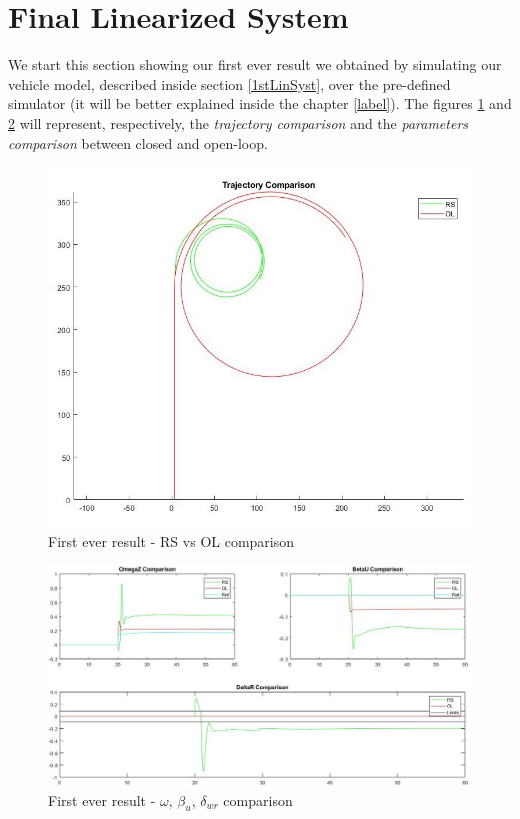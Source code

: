 \section{Final Linearized System} \label{Final LTI}
	We start this section showing our first ever result we obtained by simulating our vehicle model, described inside section \ref{1stLinSyst}, over the pre-defined simulator (it will be better explained inside the chapter \ref{label}).
	The figures \ref{FR traj} and \ref{FR ref} will represent, respectively, the \textit{trajectory comparison} and the \textit{parameters comparison} between closed and open-loop.
\begin{figure}[!b]
	\centering
	\includegraphics[scale=0.5]{../Images/LinSyst/FakeRes-trj}
	\caption{First ever result - RS vs OL comparison}
	\label{FR traj}
\end{figure}
\begin{figure}
	\centering
	\includegraphics[scale=0.5]{../Images/LinSyst/FakeRes}
	\caption{First ever result - $\omega$, $\beta_{u}$, $\delta_{wr}$ comparison}
	\label{FR ref}
\end{figure}

